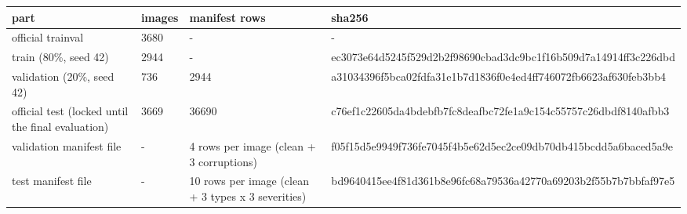 \begin{tabular}{llll}
\hline
part & images & manifest rows & sha256 \\
\hline
official trainval & 3680 & - & - \\
train (80\%, seed 42) & 2944 & - & ec3073e64d5245f529d2b2f98690cbad3dc9bc1f16b509d7a14914ff3c226dbd \\
validation (20\%, seed 42) & 736 & 2944 & a31034396f5bca02fdfa31e1b7d1836f0e4ed4ff746072fb6623af630feb3bb4 \\
official test (locked until the final evaluation) & 3669 & 36690 & c76ef1c22605da4bdebfb7fc8deafbc72fe1a9c154c55757c26dbdf8140afbb3 \\
validation manifest file & - & 4 rows per image (clean + 3 corruptions) & f05f15d5e9949f736fe7045f4b5e62d5ec2ce09db70db415bcdd5a6baced5a9e \\
test manifest file & - & 10 rows per image (clean + 3 types x 3 severities) & bd9640415ee4f81d361b8e96fc68a79536a42770a69203b2f55b7b7bbfaf97e5 \\
\hline
\end{tabular}

